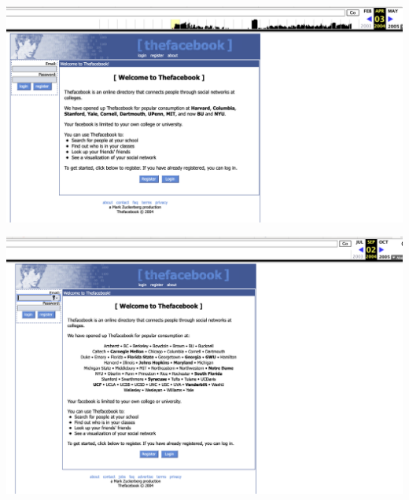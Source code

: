\documentclass{beamer}
\begin{document}
\begin{frame}
\begin{center}
\includegraphics[scale=0.35]{./lecture_includes/wayback2}
\end{center}
\end{frame}

\begin{frame}
\begin{center}
\includegraphics[scale=0.25]{./lecture_includes/wayback3}
\end{center}
\end{frame}
\end{document}
